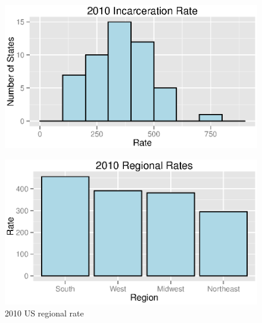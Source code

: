 \documentclass{exam}
\begin{document}
  \begin{figure}[H]
    \centering
    \includegraphics[scale = 0.9]{figures/rate_histogram_2010.eps}
  \end{figure}

  \begin{figure}[H]
    \centering
    \includegraphics[scale = 0.9]{figures/regional_rates_2010.eps}
    \caption{2010 US regional rate}
  \end{figure}
\end{document}
